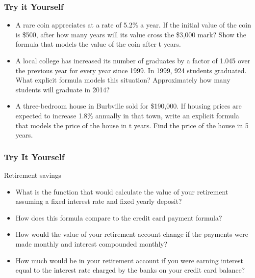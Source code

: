 \documentclass[notheorems
          ]
          {beamer}
\begin{document}
\begin{frame}
 \frametitle { Try it Yourself  }
 
 \begin{itemize} [<*>]
 
  \item A rare coin appreciates at a rate of 5.2\% a year. If the initial value of the coin is \$500, after how many years will its
value cross the \$3,000 mark? Show the formula that models the value of the coin after t years.
 
  \item A local college has increased its number of graduates by a factor of 1.045 over the previous year for every year since
1999. In 1999, 924 students graduated. What explicit formula models this situation? Approximately how many
students will graduate in 2014?
 
 
 \item A three-bedroom house in Burbville sold for \$190,000. If housing prices are expected to increase 1.8\% annually in
that town, write an explicit formula that models the price of the house in t years. Find the price of the house in 5
years. 

 
 \end{itemize}
\end{frame}
% 
% 

\begin{frame}
 \frametitle { Try It Yourself  }
 Retirement savings
 \begin{itemize} [<*>] 
  \item What is the function that would calculate the value of your retirement
  assuming a fixed interest rate and fixed yearly deposit? 
  \item How does this formula compare to the credit card payment formula?
  \item How would the value of your retirement account change if the payments were
  made monthly and interest compounded monthly?
  \item How much would be in your retirement account if you were earning interest equal 
  to the interest rate charged by the banks on your credit card balance? 
 \end{itemize}


\end{frame}
\end{document}
